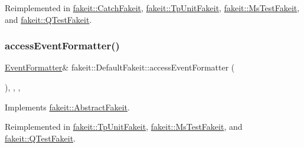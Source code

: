 Reimplemented in \mbox{\hyperlink{classfakeit_1_1CatchFakeit_aaadf534923d2255186e3a13446828b05}{fakeit\+::\+Catch\+Fakeit}}, \mbox{\hyperlink{classfakeit_1_1TpUnitFakeit_ae0f3713842b30e36ee1b0ce03a070b59}{fakeit\+::\+Tp\+Unit\+Fakeit}}, \mbox{\hyperlink{classfakeit_1_1MsTestFakeit_ad4e89ab859aa132a1f35fc0fea7d05a2}{fakeit\+::\+Ms\+Test\+Fakeit}}, and \mbox{\hyperlink{classfakeit_1_1QTestFakeit_a3760d57c61ed1572bcf5cded00f643ec}{fakeit\+::\+Q\+Test\+Fakeit}}.

\mbox{\label{classfakeit_1_1DefaultFakeit_a02cb8f08a94e7bf830c87f74f20c9bd9}} 
\subsubsection{\texorpdfstring{accessEventFormatter()}{accessEventFormatter()}\hspace{0.1cm}{\footnotesize\ttfamily [8/9]}}
{\footnotesize\ttfamily \mbox{\hyperlink{structfakeit_1_1EventFormatter}{Event\+Formatter}}\& fakeit\+::\+Default\+Fakeit\+::access\+Event\+Formatter (\begin{DoxyParamCaption}{ }\end{DoxyParamCaption})\hspace{0.3cm}{\ttfamily [inline]}, {\ttfamily [override]}, {\ttfamily [protected]}, {\ttfamily [virtual]}}



Implements \mbox{\hyperlink{classfakeit_1_1AbstractFakeit_a443a7ac12208c55f2ae4fa072e983476}{fakeit\+::\+Abstract\+Fakeit}}.



Reimplemented in \mbox{\hyperlink{classfakeit_1_1TpUnitFakeit_ae0f3713842b30e36ee1b0ce03a070b59}{fakeit\+::\+Tp\+Unit\+Fakeit}}, \mbox{\hyperlink{classfakeit_1_1MsTestFakeit_ad4e89ab859aa132a1f35fc0fea7d05a2}{fakeit\+::\+Ms\+Test\+Fakeit}}, and \mbox{\hyperlink{classfakeit_1_1QTestFakeit_a3760d57c61ed1572bcf5cded00f643ec}{fakeit\+::\+Q\+Test\+Fakeit}}.

\mbox{\label{classfakeit_1_1DefaultFakeit_a02cb8f08a94e7bf830c87f74f20c9bd9}} 
